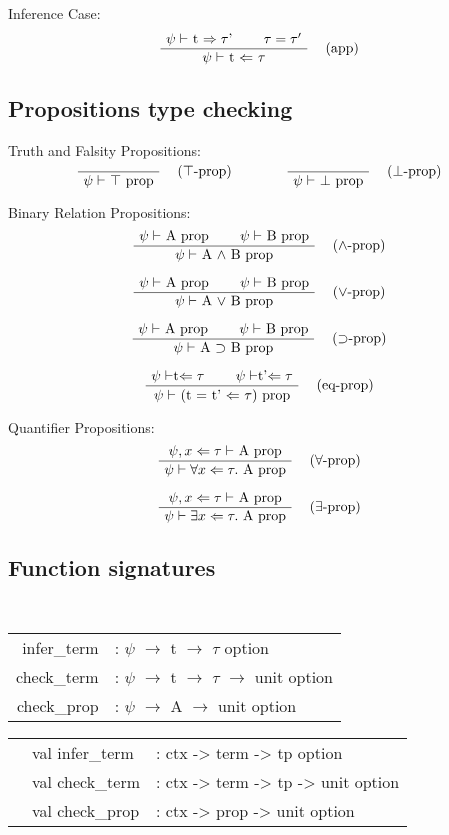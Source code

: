 \documentclass[twoside,a4paper]{article}
\theoremstyle{definition}
\begin{document}
Inference Case:
\[
\AxiomC{$\psi \vdash$ t $\Rightarrow \tau$'}
\AxiomC{$\tau = \tau'$}
\RightLabel{\quad (app)}
\BinaryInfC{$\psi \vdash$ t $\Leftarrow$ $\tau$}
\DisplayProof
\]

\subsection{Propositions type checking}
Truth and Falsity Propositions:
\[
\AxiomC{}
\RightLabel{\quad ($\top$-prop)}
\UnaryInfC{$\psi \vdash$ $\top$ prop}
\DisplayProof
\qquad
\qquad
\AxiomC{}
\RightLabel{\quad ($\bot$-prop)}
\UnaryInfC{$\psi \vdash$ $\bot$ prop}
\DisplayProof
\]

Binary Relation Propositions:
\[
\AxiomC{$\psi \vdash$ A prop}
\AxiomC{$\psi \vdash$ B prop}
\RightLabel{\quad ($\wedge$-prop)}
\BinaryInfC{$\psi \vdash$ A $\wedge$ B prop}
\DisplayProof
\]

\[
\AxiomC{$\psi \vdash$ A prop}
\AxiomC{$\psi \vdash$ B prop}
\RightLabel{\quad ($\vee$-prop)}
\BinaryInfC{$\psi \vdash$ A $\vee$ B prop}
\DisplayProof
\]

\[
\AxiomC{$\psi \vdash$ A prop}
\AxiomC{$\psi \vdash$ B prop}
\RightLabel{\quad ($\supset$-prop)}
\BinaryInfC{$\psi \vdash$ A $\supset$ B prop}
\DisplayProof
\]

\[
\AxiomC{$\psi \vdash $t$ \Leftarrow \tau$}
\AxiomC{$\psi \vdash $t'$ \Leftarrow \tau$}
\RightLabel{\quad (eq-prop)}
\BinaryInfC{$\psi \vdash$ (t = t' $\Leftarrow$ $\tau$) prop}
\DisplayProof
\]

Quantifier Propositions:
\[
\AxiomC{$\psi , x \Leftarrow \tau \vdash$ A prop}
\RightLabel{\quad ($\forall$-prop)}
\UnaryInfC{$\psi \vdash \forall x \Leftarrow \tau .$ A prop}
\DisplayProof
\]

\[
\AxiomC{$\psi , x \Leftarrow \tau \vdash$ A prop}
\RightLabel{\quad ($\exists$-prop)}
\UnaryInfC{$\psi \vdash \exists x \Leftarrow \tau .$ A prop}
\DisplayProof
\]

\subsection{Function signatures}
\begin{center}
\tt
\begin{tabular} {rl}
infer_term &: $\psi$ $\rightarrow$ t $\rightarrow$ $\tau$ option
\\
check_term &: $\psi$ $\rightarrow$ t $\rightarrow$ $\tau$ $\rightarrow$ unit option
\\
check_prop &: $\psi$ $\rightarrow$ A $\rightarrow$ unit option
\end{tabular}

\begin{tabular} {rll}

&val infer_term &: ctx -> term -> tp option
\\
&val check_term &: ctx -> term -> tp -> unit option
\\
&val check_prop &: ctx -> prop -> unit option

\end{tabular}
\end{center}
\end{document}
